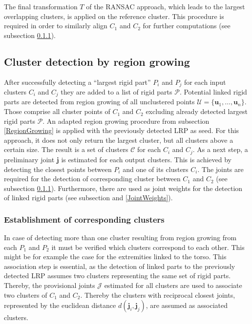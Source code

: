 The final transformation $T$ of the RANSAC approach, which leads to the largest overlapping clusters, is applied on the reference cluster. This procedure is required in order to similarly align $C_1$ and $C_2$ for further computations (see subsection \ref{CorrespondingClusters}).

\subsection{Cluster detection by region growing}
\label{cluster}
After successfully detecting a ``largest rigid part'' $P_i$ and $P_j$ for each input clusters $C_i$ and $C_j$ they are added to a list of rigid parts $\mathcal{P}$. Potential linked rigid parts are detected from region growing of all unclustered points $\mathcal{U} =  \{\boldsymbol{u}_1,\ldots,\boldsymbol{u}_n\}$. Those comprise all cluster points of $C_1$ and $C_2$ excluding already detected largest rigid parts $\mathcal{P}$. An adapted region growing procedure from subsection \ref{RegionGrowing} is applied with the previously detected LRP as seed. 
For this approach, it does not only return the largest cluster, but all clusters above a certain size. The result is a set of clusters $\mathcal{C}$ for each $C_i$ and $C_j$. As a next step, a preliminary joint $\boldsymbol{j}$ is estimated for each output clusters. This is achieved by detecting the closest points between $P_i$ and one of its clusters $C_i$. The joints are required for the detection of corresponding cluster between $C_1$ and $C_2$ (see subsection \ref{CorrespondingClusters}). Furthermore, there are used as joint weights for the detection of linked rigid parts (see subsection  and \ref{JointWeights}).

\subsubsection{Establishment of corresponding clusters}
\label{CorrespondingClusters}
In case of detecting more than one cluster resulting from region growing from each $P_1$ and $P_2$ it must be verified which clusters correspond to each other. This might be for example the case for the extremities linked to the torso. This association step is essential, as the detection of linked parts to the previously detected LRP assumes two clusters representing the same set of rigid parts. Thereby, the provisional joints $\mathcal{J}$ estimated for all clusters are used to associate two clusters of $C_1$ and $C_2$. Thereby the clusters with reciprocal closest joints, represented by the euclidean distance $d(\boldsymbol{j}_i,\boldsymbol{j}_j)$, are assumed as associated clusters.


